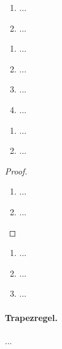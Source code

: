 \documentclass[12pt]{scrreprt}
\begin{document}
\begin{bem}\label{}
\begin{enumerate}
\item ...
\item ...
\end{enumerate}
\end{bem}

\begin{bsp}\label{}
\begin{enumerate}
\item ...
\item ...
\item ...
\item ...
\end{enumerate}
\end{bsp}

\begin{satz}\label{}
\begin{enumerate}
\item ...
\item ...
\end{enumerate}
\end{satz}
\begin{bem*}

\end{bem*}
\begin{proof}
\begin{enumerate}
\item ...
\item ...
\end{enumerate}
\end{proof}

\begin{bsp}\label{}
\begin{enumerate}
\item ...
\item ...
\item ...
\end{enumerate}
\end{bsp}

\begin{bsp}\label{}

\end{bsp}

\begin{bsp}\label{}

\end{bsp}

\paragraph{Trapezregel.} ...
\end{document}
